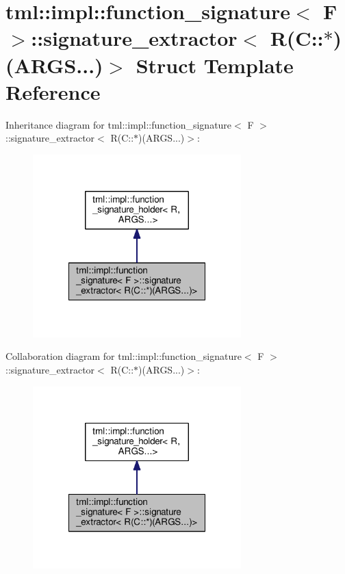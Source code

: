 \hypertarget{structtml_1_1impl_1_1function__signature_1_1signature__extractor_3_01_r_07_c_1_1_5_08_07_a_r_g_s_8_8_8_08_4}{\section{tml\+:\+:impl\+:\+:function\+\_\+signature$<$ F $>$\+:\+:signature\+\_\+extractor$<$ R(C\+:\+:$\ast$)(A\+R\+G\+S...)$>$ Struct Template Reference}
\label{structtml_1_1impl_1_1function__signature_1_1signature__extractor_3_01_r_07_c_1_1_5_08_07_a_r_g_s_8_8_8_08_4}
}


Inheritance diagram for tml\+:\+:impl\+:\+:function\+\_\+signature$<$ F $>$\+:\+:signature\+\_\+extractor$<$ R(C\+:\+:$\ast$)(A\+R\+G\+S...)$>$\+:
\nopagebreak
\begin{figure}[H]
\begin{center}
\leavevmode
\includegraphics[width=228pt]{structtml_1_1impl_1_1function__signature_1_1signature__extractor_3_01_r_07_c_1_1_5_08_07_a_r_g_s_8_8_8_08_4__inherit__graph}
\end{center}
\end{figure}


Collaboration diagram for tml\+:\+:impl\+:\+:function\+\_\+signature$<$ F $>$\+:\+:signature\+\_\+extractor$<$ R(C\+:\+:$\ast$)(A\+R\+G\+S...)$>$\+:
\nopagebreak
\begin{figure}[H]
\begin{center}
\leavevmode
\includegraphics[width=228pt]{structtml_1_1impl_1_1function__signature_1_1signature__extractor_3_01_r_07_c_1_1_5_08_07_a_r_g_s_8_8_8_08_4__coll__graph}
\end{center}
\end{figure}
